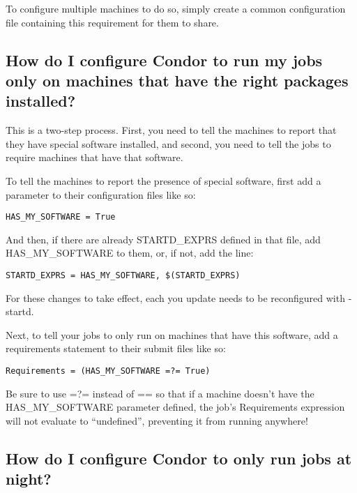 To configure multiple machines to do so, simply create a common
configuration file containing this requirement for them to share.

\subsection*{How do I configure Condor to run my jobs only on machines that have the right packages installed?}

This is a two-step process.
First, you need to tell the machines to report that they have special
software installed, and second, you need to tell the jobs to require
machines that have that software.

To tell the machines to report the presence of special software, first
add a parameter to their configuration files like so:

\begin{verbatim}HAS_MY_SOFTWARE = True\end{verbatim}

And then, if there are already STARTD\_EXPRS defined in that file, add
HAS\_MY\_SOFTWARE to them, or, if not, add the line:

\begin{verbatim}STARTD_EXPRS = HAS_MY_SOFTWARE, $(STARTD_EXPRS)\end{verbatim}

\Note For these changes to take effect, each  you update
needs to be reconfigured with  -startd.

Next, to tell your jobs to only run on machines that have this
software, add a requirements statement to their submit files like so:

\begin{verbatim}Requirements = (HAS_MY_SOFTWARE =?= True)\end{verbatim}

\Note Be sure to use =?= instead of == so that if a machine doesn't have
the HAS\_MY\_SOFTWARE parameter defined, the job's Requirements
expression will not evaluate to ``undefined'', preventing it from
running anywhere!


\subsection*{How do I configure Condor to only run jobs at night?}

